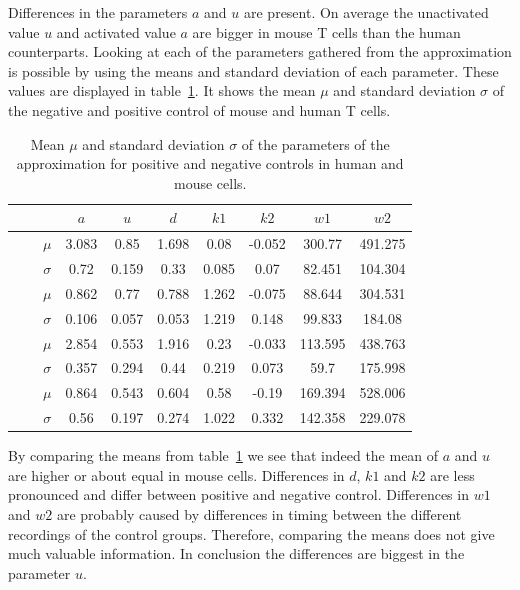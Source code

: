 Differences in the parameters $a$ and $u$ are present. On average the unactivated value $u$ and activated value $a$ are bigger in mouse T cells than the human counterparts. Looking at each of the parameters gathered from the approximation is possible by using the means and standard deviation of each parameter. These values are displayed in table~\ref{tab:mean_std_parameters}. It shows the mean $\mu$ and standard deviation $\sigma$ of the negative and positive control of mouse and human T cells.

\begin{table}[h!]
	\centering
	\begin{tabular}{|c|c|c|c|c|c|c|c|c|c|}
		\hline
		& & & $a$ & $u$ & $d$ & $k1$ & $k2$ & $w1$ & $w2$\\
		\hline
		\hline
		\multirow{4}{*}{\rotatebox[origin=c]{90}{\textbf{mouse}}} & \multirow{2}{*}{\rotatebox[origin=c]{90}{\textbf{pos}}} & $\mu$ & 3.083 & 0.85 & 1.698 & 0.08 & -0.052 & 300.77 & 491.275\\
		\cline{3-10}
		& & $\sigma$ & 0.72 & 0.159 & 0.33 & 0.085 & 0.07 & 82.451 & 104.304\\
		\cline{2-10}
		& \multirow{2}{*}{\rotatebox[origin=c]{90}{\textbf{neg}}} & $\mu$ & 0.862 & 0.77 & 0.788 & 1.262 & -0.075 & 88.644 & 304.531\\
		\cline{3-10}
		& & $\sigma$ & 0.106 & 0.057 & 0.053 & 1.219 & 0.148 & 99.833 & 184.08\\
		\hline
		\multirow{4}{*}{\rotatebox[origin=c]{90}{\textbf{human}}} & \multirow{2}{*}{\rotatebox[origin=c]{90}{\textbf{pos}}} & $\mu$ & 2.854 & 0.553 &  1.916 & 0.23 & -0.033 & 113.595 & 438.763\\
		\cline{3-10}
		& & $\sigma$ & 0.357 & 0.294 & 0.44 & 0.219 & 0.073 & 59.7 & 175.998\\
		\cline{2-10}
		& \multirow{2}{*}{\rotatebox[origin=c]{90}{\textbf{neg}}} & $\mu$ & 0.864 & 0.543 & 0.604 & 0.58 & -0.19 & 169.394 & 528.006 \\
		\cline{3-10}
		& & $\sigma$ & 0.56 & 0.197 & 0.274 & 1.022 & 0.332 & 142.358 & 229.078 \\
		\hline
	\end{tabular}
	\caption{Mean $\mu$ and standard deviation $\sigma$ of the parameters of the approximation for positive and negative controls in human and mouse cells.}
	\label{tab:mean_std_parameters}
\end{table}

By comparing the means from table~\ref{tab:mean_std_parameters} we see that indeed the mean of $a$ and $u$ are higher or about equal in mouse cells. Differences in $d$, $k1$ and $k2$ are less pronounced and differ between positive and negative control. Differences in $w1$ and $w2$ are probably caused by differences in timing between the different recordings of the control groups. Therefore, comparing the means does not give much valuable information. In conclusion the differences are biggest in the parameter $u$.

